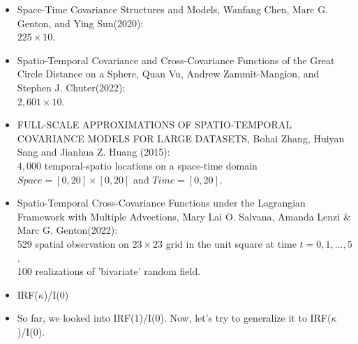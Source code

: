 \documentclass[11pt]{article}
\begin{document}
\begin{itemize}
\item 
Space-Time Covariance Structures and Models, Wanfang Chen, Marc G. Genton, and Ying Sun(2020):\\
 $225 \times 10$.\\
 
 \item
 Spatio-Temporal Covariance and Cross-Covariance Functions of the Great Circle Distance on a Sphere, Quan Vu, Andrew Zammit-Mangion, and Stephen J. Chuter(2022):\\
 $2,601 \times 10$.\\
 
 \item
 FULL-SCALE APPROXIMATIONS OF SPATIO-TEMPORAL COVARIANCE MODELS FOR LARGE DATASETS, Bohai Zhang, Huiyan Sang and Jianhua Z. Huang (2015):\\
 $4,000$ temporal-spatio locations on a space-time domain $Space=[0,20] \times [0,20]$ and $Time=[0,20]$.\\
 
 \item
Spatio-Temporal Cross-Covariance Functions under the Lagrangian Framework with Multiple Advections, Mary Lai O. Salvana, Amanda Lenzi \& Marc G. Genton(2022):\\
529 spatial observation on $23 \times 23$ grid in the unit square at time $t=0,1,...,5$.\\ 
100 realizations of 'bivariate' random field.\\


\pagebreak


\item IRF($\kappa$)/I(0)\\

\item
So far, we looked into IRF(1)/I(0). Now, let's try to generalize it to IRF($\kappa$)/I(0).\\


\end{itemize}
\end{document}
